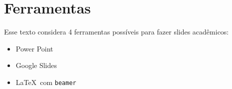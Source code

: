 \section{Ferramentas}

Esse texto considera 4 ferramentas possíveis para fazer slides acadêmicos:
\begin{itemize}
    \item Power Point
    \item Google Slides
    \item \LaTeX\  com \texttt{beamer}
\end{itemize}

